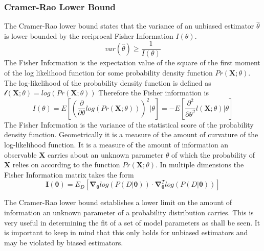 \subsubsection{Cramer-Rao Lower Bound}
The Cramer-Rao lower bound states that the variance of an unbiased estimator $\hat{\theta}$ is lower bounded by the reciprocal Fisher Information $I(\theta)$.\cite{cramerrao} 
\begin{equation}
var(\hat{\theta}) \geq \frac{1}{I(\theta)}
\label{eq:cramerao}
\end{equation}
The Fisher Information is the expectation value of the square of the first moment of the log likelihood function for some probability density function $Pr(\mathbf{X};\theta)$. The log-likelihood of the probability density function is defined as $\mathcal{l}(\mathbf{X};\theta) = log(Pr(\mathbf{X};\theta))$
Therefore the Fisher information is 
\begin{equation}
I(\theta) = E\left[\left(\frac{\partial}{\partial \theta} log (Pr(\mathbf{X};\theta)) \right)^2 \Big| \theta \right] = -E\left[\frac{\partial^2}{\partial\theta^2} l(\mathbf{X};\theta) \Big| \theta \right]
\label{eq:fisherinformation}
\end{equation}
The Fisher Information is the variance of the statistical score of the probability density function. Geometrically it is a measure of the amount of curvature of the log-likelihood function. It is a measure of the amount of information an observable $\mathbf{X}$ carries about an unknown parameter $\theta$ of which the probability of $\mathbf{X}$ relies on according to the function $Pr(\mathbf{X};\theta)$. In multiple dimensions the Fisher Information matrix takes the form 
\begin{equation}
\mathbf{I}(\mathbf{\theta}) = E_D[\mathbf{\nabla}_\mathbf{\theta}log(P(D|\mathbf{\theta}))\cdot \mathbf{\nabla}^T_\mathbf{\theta}log(P(D|\mathbf{\theta}))]
\label{eq:fishermatrix}
\end{equation}

The Cramer-Rao lower bound establishes a lower limit on the amount of information an unknown parameter of a probability distribution carries.\cite{cramerrao2} This is very useful in determining the fit of a set of model parameters as shall be seen. It is important to keep in mind that this only holds for unbiased estimators and may be violated by biased estimators. 

